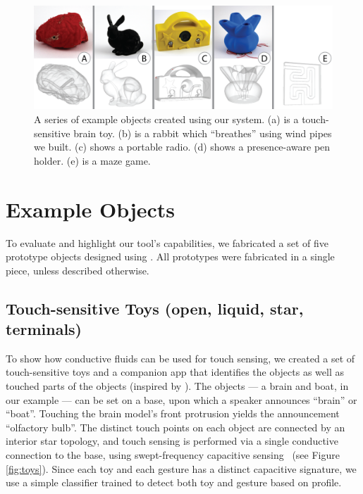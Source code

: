 \begin{figure}
\centering
    \includegraphics[width=7in]{figures/examples.png}
\caption{A series of example objects created using our system.  (a) is a touch-sensitive brain toy.  (b) is a rabbit which ``breathes'' using wind pipes we built.  (c) shows a portable radio.  (d) shows a presence-aware pen holder.  (e) is a maze game.}
\label{fig:examples}
\end{figure}

\section{Example Objects}
To evaluate and highlight our tool's capabilities, we fabricated a set of five prototype objects designed using \systemnamenospace.  All prototypes were fabricated in a single piece, unless described otherwise. 

\subsection{Touch-sensitive Toys (open, liquid, star, terminals)}

To show how conductive fluids can be used for touch sensing, we created a set of touch-sensitive toys and a companion app that identifies the objects as well as touched parts of the objects (inspired by \cite{Harrison-acoustic}). The objects --- a brain and boat, in our example --- can be set on a base, upon which a speaker announces ``brain'' or ``boat''. Touching the brain model's front protrusion yields the announcement ``olfactory bulb''. The distinct touch points on each object are connected by an interior star topology, and touch sensing is performed via a single conductive connection to the base, using swept-frequency capacitive sensing~\cite{Sato-touche} (see Figure \ref{fig:toys}). %
Since each toy and each gesture has a distinct capacitive signature, we use a simple classifier trained to detect both toy and gesture based on profile.


